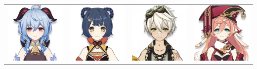 \documentclass[11pt]{article}
\begin{document}
\begin{center}
    \begin{tabular}{m{} m{} m{} m{}}
        \includegraphics[scale = 0.25]{Character_Ganyu.png}  & \includegraphics[scale = 0.25]{Character_Xiangling.png} &  \includegraphics[scale = 0.25]{Character_Bennett.png} & \includegraphics[scale = 0.25]{Character_Yanfei.png}\\
    \end{tabular}
\end{center}
\end{document}
